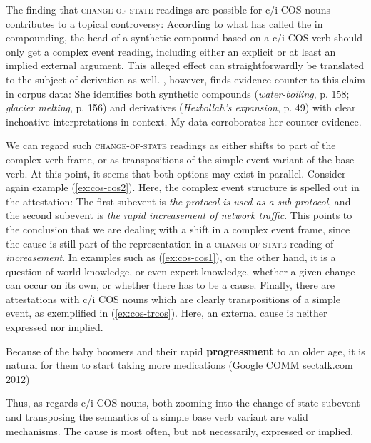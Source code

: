 \noindent The finding that \textsc{change-of-state} readings are possible for c/i COS nouns contributes to a topical controversy: According to what \citet[587]{Borer.2013} has called the  in compounding, the head of a synthetic compound based on a c/i COS verb should only get a complex event reading, including either an explicit or at least an implied external argument. This alleged effect can straightforwardly be translated to the subject of derivation as well. \citet{Lieber.2016}, however, finds evidence counter to this claim in corpus data: She identifies both synthetic compounds (\textit{water-boiling}, p. 158; \textit{glacier melting}, p. 156) and derivatives (\textit{Hezbollah's expansion}, p. 49) with clear inchoative interpretations in context. My data corroborates her counter-evidence.

We can regard such \textsc{change-of-state} readings as either shifts to part of the complex verb frame, or as transpositions of the simple event variant of the base verb. At this point, it seems that both options may exist in parallel. Consider again example (\ref{ex:cos-cos2}). Here, the complex event structure is spelled out in the attestation: The first subevent is \textit{the protocol is used as a sub-protocol}, and the second subevent is \textit{the rapid increasement of network traffic}.  
This points to the conclusion that we are dealing with a shift in a complex event frame, since the cause is still part of the representation in a \textsc{change-of-state} reading of \textit{increasement}. In examples such as (\ref{ex:cos-cos1}), on the other hand, it is a question of world knowledge, or even expert knowledge, whether a given change can occur on its own, or whether there has to be a cause. Finally, there are attestations with c/i COS nouns which are clearly transpositions of a simple event, as exemplified in (\ref{ex:cos-trcos}). Here, an external cause is neither expressed nor implied. 

\begin{exe}
  \ex \label{ex:cos-trcos} Because of the baby boomers and their rapid \textbf{progressment} to an older age, it is natural for them to start taking more medications {\small(Google COMM sectalk.com 2012)}
\end{exe}

\noindent Thus, as regards c/i COS nouns, both zooming into the change-of-state subevent and transposing the semantics of a simple base verb variant are valid mechanisms. The cause is most often, but not necessarily, expressed or implied. 

